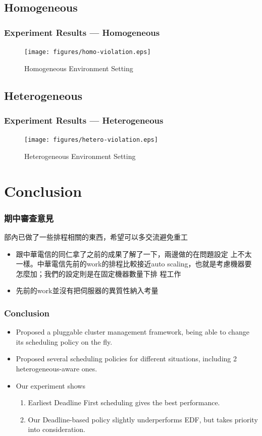 \documentclass{beamer}
\begin{document}
\subsection{Homogeneous}
\begin{frame}
  \frametitle{Experiment Results --- Homogeneous}
  \begin{figure}[htbp]
    \centering
    \texttt{[image: figures/homo-violation.eps]}
    \caption{Homogeneous Environment Setting}
  \end{figure}
\end{frame}

\subsection{Heterogeneous}
\begin{frame}
  \frametitle{Experiment Results --- Heterogeneous}
  \begin{figure}[htbp]
    \centering
    \texttt{[image: figures/hetero-violation.eps]}
    \caption{Heterogeneous Environment Setting}
  \end{figure}
\end{frame}

\section{Conclusion}

\begin{frame}
  \frametitle{期中審查意見}
  部內已做了一些排程相關的東西，希望可以多交流避免重工
  \begin{itemize}

    \item 跟中華電信的同仁拿了之前的成果了解了一下，兩邊做的在問題設定
      上不太一樣。中華電信先前的work的排程比較接近auto
      scaling，也就是考慮機器要怎麼加；我們的設定則是在固定機器數量下排
      程工作
    \item 先前的work並沒有把伺服器的異質性納入考量
  \end{itemize}
\end{frame}
\begin{frame}
  \frametitle{Conclusion}
  \begin{itemize}
    \item Proposed a pluggable cluster management framework, being able
      to change its scheduling policy on the fly.
    \item Proposed several scheduling policies for different situations,
      including 2 heterogeneous-aware ones.
    \item Our experiment shows 
      \begin{enumerate}
        \item Earliest Deadline First scheduling gives the best performance.
        \item Our Deadline-based policy slightly underperforms EDF,
          but takes priority into consideration.
      \end{enumerate}
  \end{itemize}
\end{frame}
\end{document}
